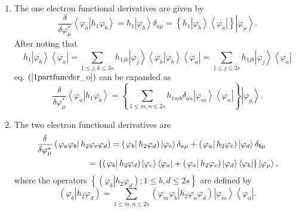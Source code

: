 \documentclass{preprint}
\begin{document}
\begin{enumerate}
\item The one electron functional derivatives are given by
\begin{equation}
\frac{\delta}{\delta\varphi_{\mu}^{\ast}}\left\langle \left. \varphi
_{a}\right\vert h_{1}\varphi_{b}\right\rangle =h_{1}\left\vert \varphi
_{b}\right\rangle \delta_{a\mu}=\left\{ h_{1}\left\vert \varphi
_{b}\right\rangle \left\langle \varphi_{a}\right\vert \right\} \left\vert
\varphi_{\mu}\right\rangle .  \label{1partfuncder_o}
\end{equation}
After noting that
\begin{equation}
h_{1}\left\vert \varphi_{b}\right\rangle \left\langle \varphi_{a}\right\vert
=\sum_{1\leq j,k\leq2s}h_{1jk}\left\vert \varphi_{j}\right\rangle
\left\langle \left. \varphi_{k}\right\vert \varphi_{b}\right\rangle
\left\langle \varphi_{a}\right\vert =\sum_{1\leq j\leq2s}h_{1jb}\left\vert
\varphi _{j}\right\rangle \left\langle \varphi_{a}\right\vert
\end{equation}
eq. $\left( \ref{1partfuncder_o}\right) $ can be expanded as
\begin{equation}
\frac{\delta}{\delta\varphi_{\mu}^{\ast}}\left\langle \left. \varphi
_{a}\right\vert h_{1}\varphi_{b}\right\rangle =\left\{ \sum_{1\leq m,n\leq
2s}h_{1mb}\delta_{an}\left\vert \varphi_{m}\right\rangle \left\langle
\varphi_{n}\right\vert \right\} \left\vert \varphi_{\mu}\right\rangle .
\label{1partfuncder_ex}
\end{equation}

\item The two electron functional derivatives are
\begin{align}
& \frac{\delta}{\delta\varphi_{\mu}^{\ast}}\left( \left.
\varphi_{a}\varphi_{b}\right\vert h_{2}\varphi_{c}\varphi_{d}\right) =\left(
\left. \varphi_{b}\right\vert h_{2}\varphi_{d}\right) \left\vert \varphi
_{c}\right\rangle \delta_{a\mu}+\left( \left. \varphi_{a}\right\vert
h_{2}\varphi_{c}\right) \left\vert \varphi_{d}\right\rangle \delta_{b\mu }
\notag \\
& \qquad\qquad\qquad\left. =\right. \left\{ \left( \left. \varphi
_{b}\right\vert h_{2}\varphi_{d}\right) \left\vert \varphi_{c}\right\rangle
\left\langle \varphi_{a}\right\vert +\left( \left. \varphi_{a}\right\vert
h_{2}\varphi_{c}\right) \left\vert \varphi_{d}\right\rangle \left\langle
\varphi_{b}\right\vert \right\} \left\vert \varphi_{\mu}\right\rangle ,
\label{2partfuncder_o}
\end{align}
where the operators $\left\{ \left( \left. \varphi_{b}\right\vert
h_{2}\varphi_{d}\right) ;1\leq b,d\leq2s\right\} $ are defined by
\begin{equation}
\left( \left. \varphi_{b}\right\vert h_{2}\varphi_{d}\right) =\sum_{1\leq
m,n\leq2s}\left( \left. \varphi_{m}\varphi_{b}\right\vert h_{2}\varphi
_{n}\varphi_{d}\right) \left\vert \varphi_{m}\right\rangle \left\langle
\varphi_{n}\right\vert .
\end{equation}
\end{enumerate}
\end{document}
